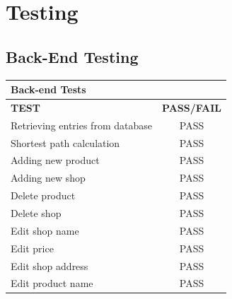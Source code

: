 \documentclass[12pt]{article}
\begin{document}
\section{Testing}
\subsection{Back-End Testing}
\begin{center}
\begin{tabular}{|l | c|}
\hline  
\textbf{Back-end Tests} & \\ \hline
\textbf{TEST} & \textbf{PASS/FAIL} \\ \hline%
Retrieving entries from database & PASS\\ \hline
Shortest path calculation & PASS\\ \hline
Adding new product & PASS\\ \hline
Adding new shop & PASS\\ \hline
Delete product & PASS\\ \hline
Delete shop & PASS\\ \hline
Edit shop name & PASS\\ \hline
Edit price & PASS\\ \hline
Edit shop address & PASS\\ \hline
Edit product name & PASS\\ \hline
\end{tabular}
\end{center}
\end{document}
